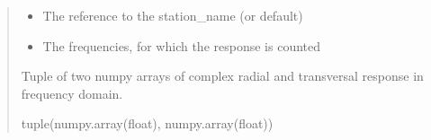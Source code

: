 \documentclass[letterpaper,10pt,english]{sphinxmanual}
\begin{document}
\begin{fulllineitems}
\begin{quote}
\begin{description}
\begin{itemize}
\item {} 
\sphinxAtStartPar
{} \textendash{} The reference to the station\_name (or default)

\item {} 
\sphinxAtStartPar
{} \textendash{} The frequencies, for which the response is counted

\end{itemize}

\sphinxAtStartPar
Tuple of two numpy arrays of complex radial and transversal response in frequency domain.

\sphinxAtStartPar
tuple(numpy.array(float), numpy.array(float))

\end{description}\end{quote}

\end{fulllineitems}

\end{document}
